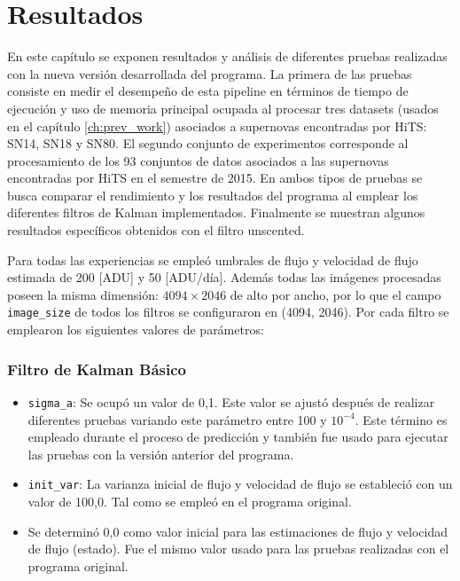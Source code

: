\chapter{Resultados}
\label{ch:resultados}
En este cap\'itulo se exponen resultados y an\'alisis de diferentes pruebas realizadas con la nueva versi\'on desarrollada del programa. La primera de las pruebas consiste en medir el desempe\~no de esta pipeline en t\'erminos de tiempo de ejecuci\'on y uso de memoria principal ocupada al procesar tres datasets (usados en el cap\'itulo \ref{ch:prev_work}) asociados a supernovas encontradas por HiTS\cite{hits}: SN14, SN18 y SN80. El segundo conjunto de experimentos corresponde al procesamiento de los 93 conjuntos de datos asociados a las supernovas encontradas por HiTS en el semestre de 2015. En ambos tipos de pruebas se busca comparar el rendimiento y los resultados del programa al emplear los diferentes filtros de Kalman implementados. Finalmente se muestran algunos resultados espec\'ificos obtenidos con el filtro unscented.
\bigskip


Para todas las experiencias se emple\'o umbrales de flujo y velocidad de flujo estimada de 200 [ADU] y 50 [ADU/d\'ia]. Adem\'as todas las im\'agenes procesadas poseen la misma dimensi\'on: $4094 \times 2046$ de alto por ancho, por lo que el campo \texttt{image\_size} de todos los filtros se configuraron en (4094, 2046). Por cada filtro se emplearon los siguientes valores de par\'ametros:

\subsection*{Filtro de Kalman B\'asico}
\begin{itemize}
\item \texttt{sigma\_a}: Se ocup\'o un valor de 0,1. Este valor se ajust\'o despu\'es de realizar diferentes pruebas variando este par\'ametro entre 100 y $10^{-4}$. Este t\'ermino es empleado durante el proceso de predicci\'on y tambi\'en fue usado para ejecutar las pruebas con la versi\'on anterior del programa. 
\item \texttt{init\_var}: La varianza inicial de flujo y velocidad de flujo se estableci\'o con un valor de 100,0. Tal como se emple\'o en el programa original.
\item Se determin\'o 0,0 como valor inicial para las estimaciones de flujo y velocidad de flujo (estado). Fue el mismo valor usado para las pruebas realizadas con el programa original.
\end{itemize}
